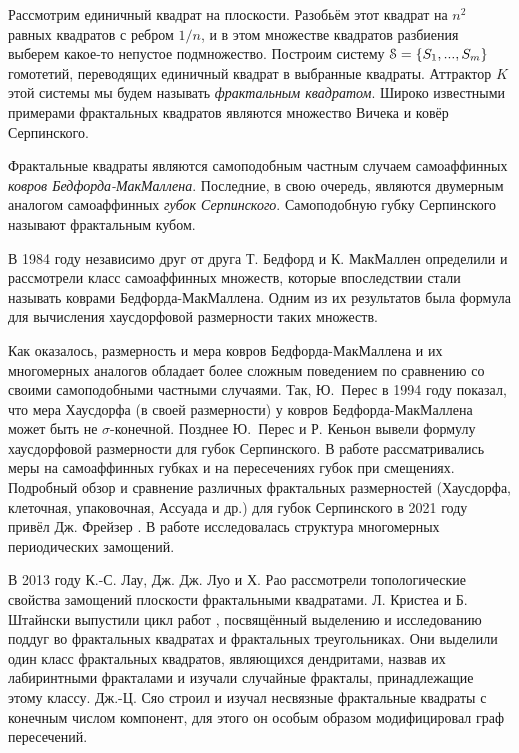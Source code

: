 Рассмотрим единичный квадрат на плоскости.
Разобьём этот квадрат на $n^2$ равных квадратов с ребром $1/n$, и в этом множестве  квадратов  разбиения выберем какое-то непустое подмножество.
Построим систему ${\EuScript S}=\{S_1,...,S_m\}$  гомотетий, переводящих единичный квадрат в выбранные  квадраты. Аттрактор $K$ этой системы мы будем называть {\em фрактальным квадратом}.
 Широко известными примерами фрактальных квадратов являются множество Вичека и ковёр Серпинского.

Фрактальные квадраты являются самоподобным частным случаем самоаффинных {\em ковров Бедфорда-МакМаллена}. 
Последние, в свою очередь, являются двумерным аналогом самоаффинных {\em губок Серпинского}.
Самоподобную губку Серпинского называют фрактальным кубом.

В 1984 году независимо друг от друга Т. Бедфорд \cite{Bedford1984} и К. МакМаллен \cite{McMullen1984} определили и рассмотрели класс самоаффинных множеств, которые впоследствии стали называть коврами Бедфорда-МакМаллена.
Одним из их результатов была формула для вычисления хаусдорфовой размерности   таких множеств.

Как оказалось, размерность и мера ковров Бедфорда-МакМаллена и их многомерных аналогов обладает более сложным поведением по сравнению со своими самоподобными частными случаями.
Так, Ю.~Перес \cite{Peres1994} в 1994 году показал, что мера Хаусдорфа (в своей размерности) у ковров Бедфорда-МакМаллена может быть не $\sigma$-конечной.
Позднее Ю.~Перес и  Р. Кеньон \cite{KenyonPeres1996} вывели формулу хаусдорфовой размерности   для губок Серпинского.
В работе \cite{EKM2009} рассматривались меры на самоаффинных губках и на пересечениях губок при смещениях.
Подробный обзор и сравнение различных фрактальных размерностей (Хаусдорфа, клеточная, упаковочная, Ассуада и др.) для губок Серпинского в 2021 году привёл Дж. Фрейзер \cite{Fraser_2021}.
В работе \cite{Zaitseva2022} исследовалась структура многомерных периодических замощений. 

В 2013 году К.-С. Лау, Дж. Дж. Луо и Х. Рао \cite{LLR2013} рассмотрели топологические свойства замощений плоскости фрактальными квадратами.
Л. Кристеа и Б. Штайнски выпустили цикл работ \cite{CS1,CS2,CS3}, посвящённый выделению и исследованию поддуг во фрактальных квадратах и фрактальных треугольниках.
Они выделили один класс фрактальных квадратов, являющихся дендритами, назвав их лабиринтными фракталами и изучали случайные фракталы, принадлежащие этому классу.
Дж.-Ц. Сяо \cite{Xiao2021} строил и изучал несвязные фрактальные квадраты с конечным числом компонент, для этого он особым образом модифицировал граф пересечений.




